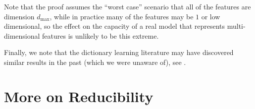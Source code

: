 \documentclass{article} %
\theoremstyle{plain}
\theoremstyle{definition}
\newcommand{\josh}[1]{{\color{orange}{\bf Josh:} #1}}
\begin{document}
Note that the proof assumes the ``worst case'' scenario that all of the features are dimension $d_{\max}$, while in practice many of the features may be $1$ or low dimensional, so the effect on the capacity of a real model that represents multi-dimensional features is unlikely to be this extreme. 

Finally, we note that the dictionary learning literature may have discovered similar results in the past (which we were unaware of), see \cite{foucart2013mathematical}.

    









\section{More on Reducibility}
\label{appendix:more_on_reducibility}
\end{document}
